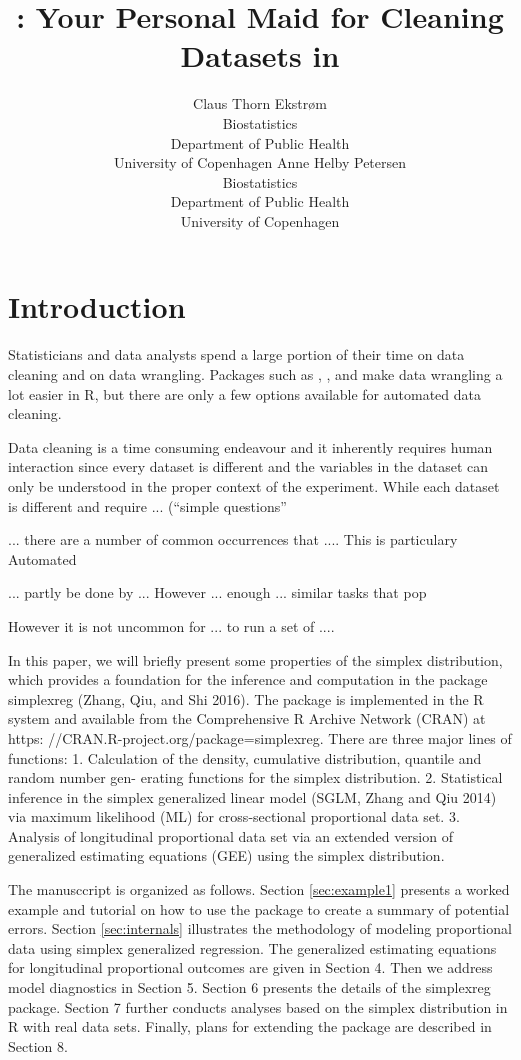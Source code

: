 \documentclass[article]{jss}
\author{Claus Thorn Ekstr\o m\\Biostatistics\\Department of Public
  Health\\University of Copenhagen \And
        Anne Helby Petersen\\Biostatistics\\Department of Public
  Health\\University of Copenhagen}
\title{\pkg{cleanR}: Your Personal Maid for Cleaning Datasets in \proglang{R}}
\begin{document}
\section{Introduction}
Statisticians and data analysts spend a large portion of their time on
data cleaning and on data wrangling. Packages such as , ,
and \pkg{} make data wrangling a lot easier in R, but there are only a
few options available for automated data cleaning.

Data cleaning is a time consuming endeavour and it inherently requires
human interaction since every dataset is different and the variables
in the dataset can only be understood in the proper context of the
experiment. While each dataset is different and require
... (``simple questions''

... there are a number of common occurrences that .... This is particulary
Automated


... partly be done by ... However ... enough ... similar tasks that
pop


However it is not uncommon for ... to run a set of ....


In this paper, we will briefly present some properties of the simplex
distribution, which provides a foundation for the inference and
computation in the package simplexreg (Zhang, Qiu, and Shi 2016). The
package is implemented in the R system and available from the
Comprehensive R Archive Network (CRAN) at https:
//CRAN.R-project.org/package=simplexreg. There are three major lines
of functions:
1. Calculation of the density, cumulative distribution, quantile and
random number gen- erating functions for the simplex distribution.
2. Statistical inference in the simplex generalized linear model
(SGLM, Zhang and Qiu 2014) via maximum likelihood (ML) for
cross-sectional proportional data set.
3. Analysis of longitudinal proportional data set via an extended
version of generalized estimating equations (GEE) using the simplex
distribution.


The manusccript is organized as follows. Section \ref{sec:example1}
presents a worked example and tutorial on how to use the 
package to create a summary of potential errors. Section
\ref{sec:internals} illustrates the methodology of modeling
proportional data using simplex generalized regression. The
generalized estimating equations for longitudinal proportional
outcomes are given in Section 4. Then we address model diagnostics in
Section 5. Section 6 presents the details of the simplexreg
package. Section 7 further conducts analyses based on the simplex
distribution in R with real data sets. Finally, plans for extending
the package are described in Section 8.
\end{document}
